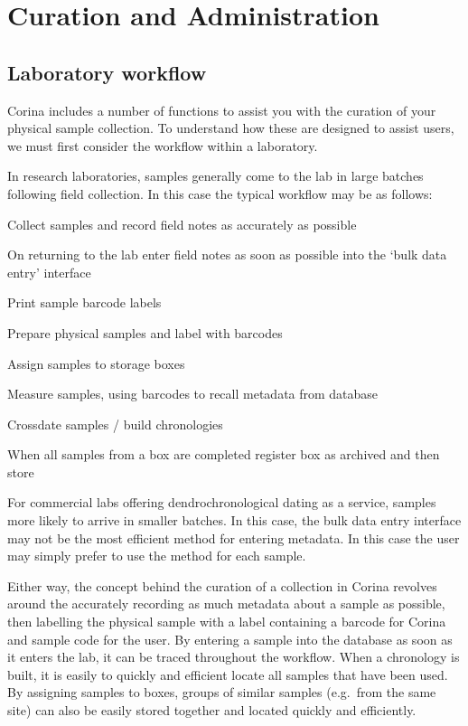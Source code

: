\chapter{Curation and Administration}


\section{Laboratory workflow}
Corina includes a number of functions to assist you with the curation of your physical sample collection.  To understand how these are designed to assist users, we must first consider the workflow within a laboratory.

In research laboratories, samples generally come to the lab in large batches following field collection.   In this case the typical workflow may be as follows:

\begin{enumerate*}
 \item Collect samples and record field notes as accurately as possible
 \item On returning to the lab enter field notes as soon as possible into the `bulk data entry' interface
 \item Print sample barcode labels
 \item Prepare physical samples and label with barcodes
 \item Assign samples to storage boxes
 \item Measure samples, using barcodes to recall metadata from database
 \item Crossdate samples / build chronologies
 \item When all samples from a box are completed register box as archived and then store
\end{enumerate*}

For commercial labs offering dendrochronological dating as a service, samples more likely to arrive in smaller batches.  In this case, the bulk data entry interface may not be the most efficient method for entering metadata.  In this case the user may simply prefer to use the  method for each sample.  

Either way, the concept behind the curation of a collection in Corina revolves around the accurately recording as much metadata about a sample as possible, then labelling the physical sample with a label containing a barcode for Corina and sample code for the user.  By entering a sample into the database as soon as it enters the lab, it can be traced throughout the workflow.  When a chronology is built, it is easily to quickly and efficient locate all samples that have been used.  By assigning samples to boxes, groups of similar samples (e.g.\ from the same site) can also be easily stored together and located quickly and efficiently.  


